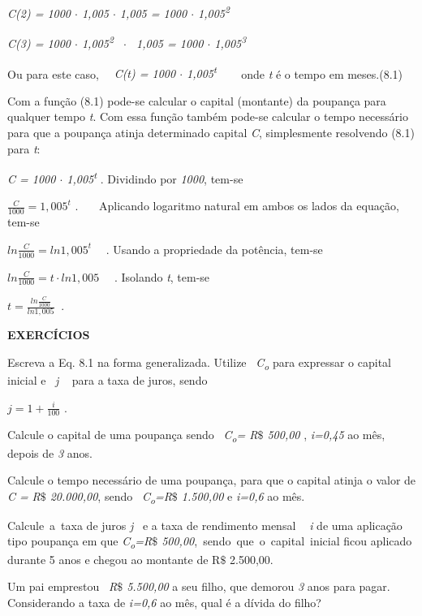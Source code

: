 \textit{C(2) = 1000 $ \cdot $  1,005 $ \cdot $  1,005 = 1000 $ \cdot $  1,005\textsuperscript{2}}

\textit{C(3) = 1000 $ \cdot $  1,005\textsuperscript{2}~ $ \cdot $ ~1,005 =  1000 $ \cdot $  1,005\textsuperscript{3}}

Ou para este caso,~~ \textit{C(t) = 1000 $ \cdot $  1,005\textsuperscript{t}} ~~~ onde \textit{t} é o tempo em meses.\quad (8.1)

Com a função (8.1) pode-se calcular o capital (montante) da poupança para qualquer tempo \textit{t}. Com essa função também pode-se calcular o tempo necessário para que a poupança atinja determinado capital \textit{C}, simplesmente resolvendo (8.1) para \textit{t}:

\textit{C = 1000 $ \cdot $  1,005\textsuperscript{t}} . Dividindo por \textit{1000}, tem-se

\( \frac{C}{1000}=1,005^{t} \) .~~~ Aplicando logaritmo natural em ambos os lados da equação, tem-se

\( ln\frac{C}{1000}=ln1,005^{t}~~~~ ^{} \) . Usando a propriedade da potência, tem-se

\( ln\frac{C}{1000}=t \cdot ln1,005^{}~~~~ ^{} \) . Isolando \textit{t}, tem-se

\( t=\frac{ln\frac{C}{1000}}{ln1,005}~  \) . \qedsymbol{}

\noindent\textbf{EXERCÍCIOS \thesubsection}
\begin{enumerate}[label=\thesubsection.\arabic*]
    \exitem{} Escreva a Eq. 8.1 na forma generalizada. Utilize~ \textit{C\textsubscript{o}} para expressar o capital inicial e~  \textit{j} ~ para a taxa de juros, sendo

    \( j=1+\frac{i}{100} \) .

	\exitem{} Calcule o capital de uma poupança sendo~ \textit{C\textsubscript{o}= R$\$$  500,00 },\textit{ i=0,45 }ao mês, depois de \textit{3 }anos.~~ 

	\exitem{} Calcule o tempo necessário de uma poupança, para que o capital atinja o valor de \textit{C =} \textit{R$\$$  20.000,00}, sendo~ \textit{C\textsubscript{o}=R$\$$  1.500,00 } e\textit{ i=0,6 }ao mês.~ 

	\exitem{} Calcule~a~taxa de juros   \textit{j}~ e a taxa de rendimento mensal \textit{~ i } de uma aplicação tipo poupança em que \textit{C\textsubscript{o}=R$\$$  500,00},~sendo~que~o~capital~inicial ficou aplicado durante 5 anos e chegou ao montante de R$\$$   2.500,00.     

	\exitem{} Um pai emprestou~ \textit{R$\$$  5.500,00} a seu filho, que demorou \textit{3} anos para pagar. Considerando a taxa de\textit{ i=0,6 }ao mês, qual é a dívida do filho?~~ 
\end{enumerate}

